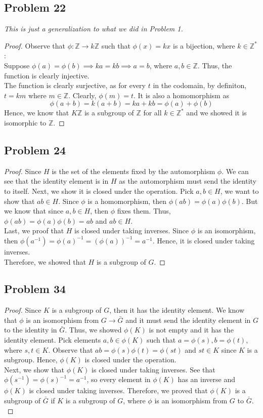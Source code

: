 \documentclass[a4paper,12pt]{article}
\begin{document}
\subsection*{Problem 22}
\textit{This is just a generalization to what we did in Problem 1.}
\begin{proof}
    Observe that $\phi : \mathbb{Z} \to k\mathbb{Z}$ such that $ \phi (x)=kx$ is a bijection, where $k \in \mathbb{Z^{*}}$: \\
Suppose $\phi(a)=\phi(b) \implies ka=kb \implies a=b$, where $a,b \in \mathbb{Z}.$ Thus, the function is clearly injective.\\
The function is clearly surjective, as for every $t$ in the codomain, by definiton, $t=km$ where $m \in \mathbb{Z}.$ Clearly, $\phi(m)=t.$
It is also a homomorphism as
\[\phi(a+b)=k(a+b)=ka+kb=\phi(a)+\phi(b)\]
Hence, we know that $K\mathbb{Z}$ is a subgroup of $\mathbb{Z}$ for all $k \in \mathbb{Z}^*$ and we showed it is isomorphic to $\mathbb{Z}.$
\end{proof}
\subsection*{Problem 24}
\begin{proof}
    Since $H$ is the set of the elements fixed by the automorphism $\phi$. We can see that the identity element is in $H$ as the automorphism must send the identity to itself. Next, we show it is closed under the operation. Pick $a,b \in H$, we want to show that $ab \in H.$ Since $\phi$ is a homomorphism, then $\phi(ab)=\phi(a)\phi(b).$ But we know that since $a,b \in H$, then $\phi$ fixes them. Thus, $\phi(ab)=\phi(a)\phi(b)=ab$ and $ab \in H.$ \\
    Last, we proof that $H$ is closed under taking inverses. Since $\phi$ is an isomorphism, then $\phi(a^{-1})=\phi(a)^{-1}=(\phi(a))^{-1}=a^{-1}.$ Hence, it is closed under taking inverses.
    \\Therefore, we showed that $H$ is a subgroup of $G.$
\end{proof}
\subsection*{Problem 34}
\begin{proof}
    Since $K$ is a subgroup of $G$, then it has the identity element. We know that $\phi$ is an isomorphism from $G \to \bar{G}$ and it must send the identity element in $G$ to the identity in $\bar{G}$. Thus, we showed $\phi(K)$ is not empty and it has the identity element.
    Pick elements $a,b \in \phi(K)$ such that $a=\phi(s), b=\phi(t)$, where $s,t \in K.$ Observe that $ab=\phi(s)\phi(t)=\phi(st)$ and $st \in K$ since $K$ is a subgroup. Hence, $\phi(K)$ is closed under the operation.\\
    Next, we show that $\phi(K)$ is closed under taking inverses. See that $\phi(s^{-1})=\phi(s)^{-1}=a^{-1}$, so every element in $\phi(K)$ has an inverse and $\phi(K)$ is closed under taking inverses.
    Therefore, we proved that $\phi(K)$ is a subgroup of $\bar{G}$ if $K$ is a subgroup of $G$, where $\phi$ is an isomorphism from $G$ to $\bar{G}.$
\end{proof}
\end{document}
